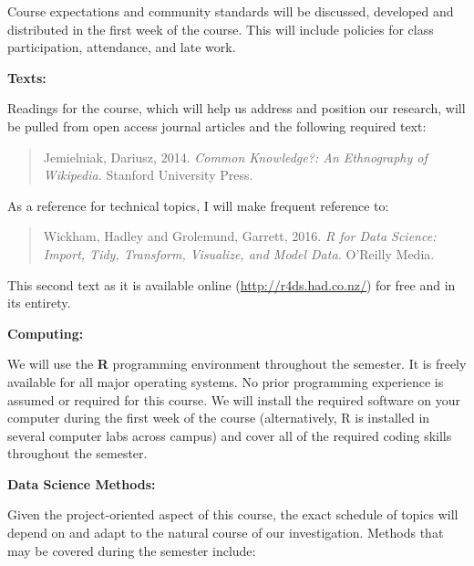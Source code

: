 \documentclass[12pt]{article}
\begin{document}
Course expectations and community standards will be discussed, developed and
distributed in the first week of the course. This will include policies for
class participation, attendance, and late work.

\vspace{0.5cm}

\textbf{Texts:} \vspace{6pt}

Readings for the course, which will help us address and position our research,
will be pulled from open access journal articles and the following required
text:

\begin{quote}
Jemielniak, Dariusz, 2014. \textit{Common Knowledge?: An Ethnography
of Wikipedia.} Stanford University Press.
\end{quote}

As a reference for technical topics, I will make frequent reference to:

\begin{quote}
Wickham, Hadley and Grolemund, Garrett, 2016.
\textit{R for Data Science: Import, Tidy, Transform, Visualize, and Model
Data.} O'Reilly Media.
\end{quote}

This second text as it is available online
(\url{http://r4ds.had.co.nz/}) for free and in its entirety.

\vspace{0.5cm}

\textbf{Computing:} \vspace{6pt}

We will use the \textbf{R} programming environment throughout the
semester. It is freely available for all major operating systems. No prior
programming experience is assumed or required for this course. We will install
the required software on your computer during the first week of the course
(alternatively, R is installed in several computer labs across campus) and
cover all of the required coding skills throughout the semester.

\vspace{0.5cm}

\textbf{Data Science Methods:} \vspace{6pt}

Given the project-oriented aspect of this course, the exact schedule of topics
will depend on and adapt to the natural course of our investigation. Methods
that may be covered during the semester include:
\end{document}
